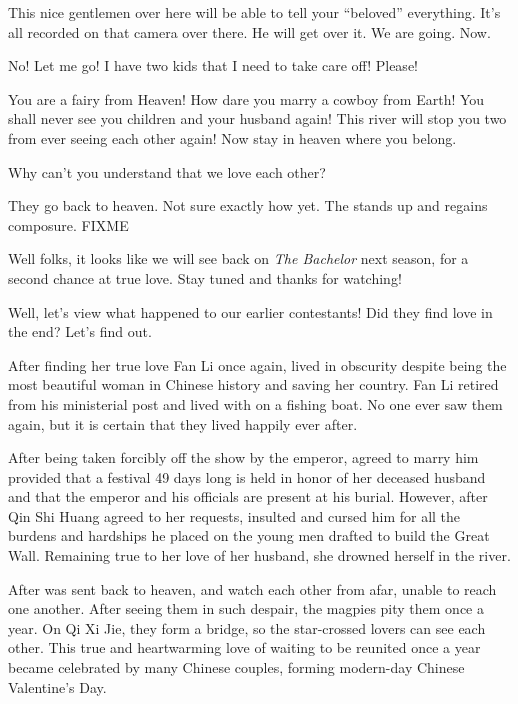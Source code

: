 \documentclass[letterpaper,12pt]{memoir}
\begin{document}
This nice gentlemen over here will be able to tell your \enquote{beloved} everything. It's all recorded on that camera over there. He will get over it. We are going. Now.

\zhinu[crying]
No! Let me go! I have two kids that I need to take care off! Please!

\niangniang%
You are a fairy from Heaven! How dare you marry a cowboy from Earth! You shall never see you children and your husband again!  This river will stop you two from ever seeing each other again! Now stay in heaven where you belong.

\zhinu[yelling]
Why can't you understand that we love each other?

\begin{dida}%
  They go back to heaven. Not sure exactly how yet. The \hostname{} stands up and regains composure. FIXME
\end{dida}

\host%
Well folks, it looks like we will see \niulangname{} back on \textit{The Bachelor} next season, for a second chance at true love. Stay tuned and thanks for watching!


Well, let's view what happened to our earlier contestants! Did they find love in the end? Let's find out.

After finding her true love Fan Li once again, \xishiname{} lived in obscurity despite being the most beautiful woman in Chinese history and saving her country. Fan Li retired from his ministerial post and lived with \xishiname{} on a fishing boat. No one ever saw them again, but it is certain that they lived happily ever after.

After being taken forcibly off the show by the emperor, \mengjiangnuname{} agreed to marry him provided that a festival 49 days long is held in honor of her deceased husband and that the emperor and his officials are present at his burial. However, after Qin Shi Huang agreed to her requests, \mengjiangnuname{} insulted and cursed him for all the burdens and hardships he placed on the young men drafted to build the Great Wall. Remaining true to her love of her husband, she drowned herself in the river.

After \zhinuname{} was sent back to heaven, \niulangname{} and \zhinuname{} watch each other from afar, unable to reach one another. After seeing them in such despair, the magpies pity them once a year. On Qi Xi Jie, they form a bridge, so the star-crossed lovers can see each other. This true and heartwarming love of waiting to be reunited once a year became celebrated by many Chinese couples, forming modern-day Chinese Valentine's Day.
\end{document}
